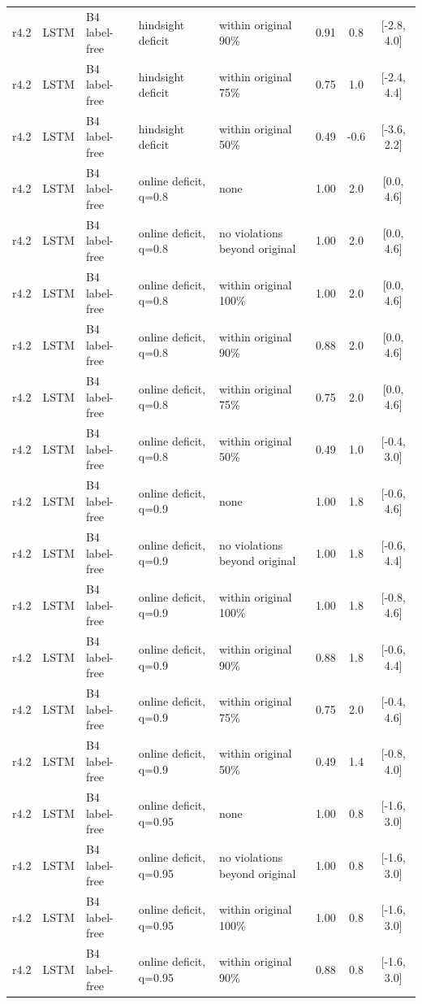 \documentclass[10pt,onecolumn,letterpaper]{article}
\begin{document}
\begin{longtable}{lllp{4.2cm}p{3.4cm}ccc}
r4.2 & LSTM & B4 label-free & hindsight deficit & within original 90\% & 0.91 & 0.8 & [-2.8, 4.0] \\
r4.2 & LSTM & B4 label-free & hindsight deficit & within original 75\% & 0.75 & 1.0 & [-2.4, 4.4] \\
r4.2 & LSTM & B4 label-free & hindsight deficit & within original 50\% & 0.49 & -0.6 & [-3.6, 2.2] \\
r4.2 & LSTM & B4 label-free & online deficit, q=0.8 & none & 1.00 & 2.0 & [0.0, 4.6] \\
r4.2 & LSTM & B4 label-free & online deficit, q=0.8 & no violations beyond original & 1.00 & 2.0 & [0.0, 4.6] \\
r4.2 & LSTM & B4 label-free & online deficit, q=0.8 & within original 100\% & 1.00 & 2.0 & [0.0, 4.6] \\
r4.2 & LSTM & B4 label-free & online deficit, q=0.8 & within original 90\% & 0.88 & 2.0 & [0.0, 4.6] \\
r4.2 & LSTM & B4 label-free & online deficit, q=0.8 & within original 75\% & 0.75 & 2.0 & [0.0, 4.6] \\
r4.2 & LSTM & B4 label-free & online deficit, q=0.8 & within original 50\% & 0.49 & 1.0 & [-0.4, 3.0] \\
r4.2 & LSTM & B4 label-free & online deficit, q=0.9 & none & 1.00 & 1.8 & [-0.6, 4.6] \\
r4.2 & LSTM & B4 label-free & online deficit, q=0.9 & no violations beyond original & 1.00 & 1.8 & [-0.6, 4.4] \\
r4.2 & LSTM & B4 label-free & online deficit, q=0.9 & within original 100\% & 1.00 & 1.8 & [-0.8, 4.6] \\
r4.2 & LSTM & B4 label-free & online deficit, q=0.9 & within original 90\% & 0.88 & 1.8 & [-0.6, 4.4] \\
r4.2 & LSTM & B4 label-free & online deficit, q=0.9 & within original 75\% & 0.75 & 2.0 & [-0.4, 4.6] \\
r4.2 & LSTM & B4 label-free & online deficit, q=0.9 & within original 50\% & 0.49 & 1.4 & [-0.8, 4.0] \\
r4.2 & LSTM & B4 label-free & online deficit, q=0.95 & none & 1.00 & 0.8 & [-1.6, 3.0] \\
r4.2 & LSTM & B4 label-free & online deficit, q=0.95 & no violations beyond original & 1.00 & 0.8 & [-1.6, 3.0] \\
r4.2 & LSTM & B4 label-free & online deficit, q=0.95 & within original 100\% & 1.00 & 0.8 & [-1.6, 3.0] \\
r4.2 & LSTM & B4 label-free & online deficit, q=0.95 & within original 90\% & 0.88 & 0.8 & [-1.6, 3.0] \\

\end{longtable}
\end{document}
